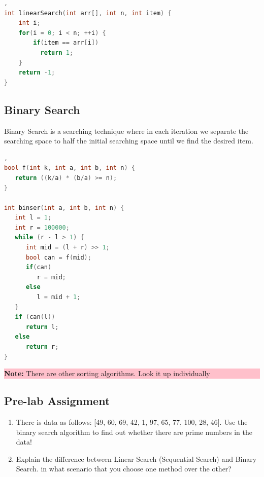 \begin{lstlisting}[language=c,caption=Linear Search Implementation], 
int linearSearch(int arr[], int n, int item) {
    int i;
    for(i = 0; i < n; ++i) {
        if(item == arr[i])
          return 1;
    }
    return -1;
}
\end{lstlisting}

\subsection{Binary Search}
Binary Search is a searching technique where in each iteration we separate the searching space to half the initial searching space
until we find the desired item.

\begin{lstlisting}[language=c,caption=Binary Search Implementation],   
bool f(int k, int a, int b, int n) {
   return ((k/a) * (b/a) >= n);
}

int binser(int a, int b, int n) {
   int l = 1;
   int r = 100000;
   while (r - l > 1) {
      int mid = (l + r) >> 1;
      bool can = f(mid);
      if(can)
         r = mid;
      else
         l = mid + 1;
   }
   if (can(l))
      return l;
   else
      return r;
}
\end{lstlisting}

\begin{center}
    \colorbox{pink}{\parbox{0.8\linewidth}{\textbf{Note:} There are other sorting algorithms. Look it up individually}}
\end{center}

\subsection{Pre-lab Assignment}
\begin{enumerate}
    \item There is data as follows: [49, 60, 69, 42, 1, 97, 65, 77, 100, 28, 46]. Use the binary search algorithm to find out whether there are prime numbers in the data!
    \item Explain the difference between Linear Search (Sequential Search) and Binary Search.
          in what scenario that you choose one method over the other?
\end{enumerate}

